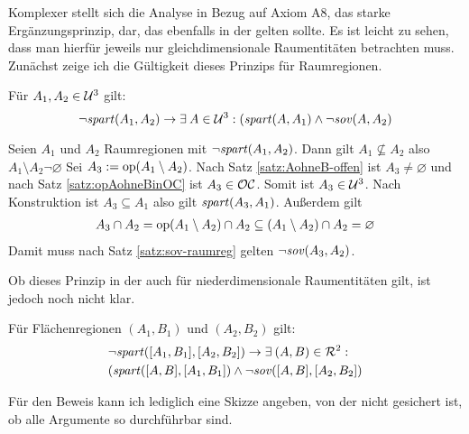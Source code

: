     Komplexer stellt sich die Analyse in Bezug auf Axiom A8, das starke Ergänzungsprinzip, dar, das ebenfalls in der \strukt gelten sollte. 
    Es ist leicht zu sehen, dass man hierfür jeweils nur gleichdimensionale Raumentitäten betrachten muss.
    Zunächst zeige ich die Gültigkeit dieses Prinzips für Raumregionen.
    \begin{satz}
        Für $A_1,A_2 \in \mathcal{U}^3$ gilt: 
        $$\neg \mathit{spart}(A_1,A_2) \to \exists\: A \in  \mathcal{U}^3: (\mathit{spart}(A,A_1) \wedge \neg \mathit{sov}(A,A_2)$$
    \end{satz}
    \begin{bew}
        Seien $A_1$ und $A_2$ Raumregionen mit $\neg \mathit{spart}(A_1,A_2)$.
        Dann gilt $A_1 \nsubseteq A_2$ also $A_1 \setminus A_2 \neg \varnothing$
        Sei $A_3 := \text{op}(A_1 \setminus A_2)$.
        Nach Satz \ref{satz:AohneB-offen} ist $A_3 \neq \varnothing$ und nach Satz \ref{satz:opAohneBinOC} ist $A_3 \in \mathcal{OC}$.
        Somit ist $A_3 \in \mathcal{U}^3$.
        Nach Konstruktion ist $A_3 \subseteq A_1$ also gilt $\mathit{spart}(A_3,A_1)$.
        Außerdem gilt
        \begin{align*}
            A_3 \cap A_2 
            = \text{op}(A_1 \setminus A_2) \cap A_2 
            \subseteq (A_1 \setminus A_2) \cap A_2 
            = \varnothing
        \end{align*}
        Damit muss nach Satz \ref{satz:sov-raumreg} gelten $\neg \mathit{sov}(A_3,A_2)$.
    \end{bew}
    Ob dieses Prinzip in der \strukt auch für niederdimensionale Raumentitäten gilt, ist jedoch noch nicht klar.
    \begin{hyp}
        Für Flächenregionen $(A_1,B_1)$ und $(A_2,B_2)$ gilt: 
        \begin{align*}
            &\neg \mathit{spart}([A_1,B_1],[A_2,B_2]) \to \exists\: (A,B) \in  \mathcal{R}^2:\\
            &(\mathit{spart}([A,B],[A_1,B_1]) \wedge \neg \mathit{sov}([A,B],[A_2,B_2])
        \end{align*}
    \end{hyp}
    Für den Beweis kann ich lediglich eine Skizze angeben, von der nicht gesichert ist, ob alle Argumente so durchführbar sind.
